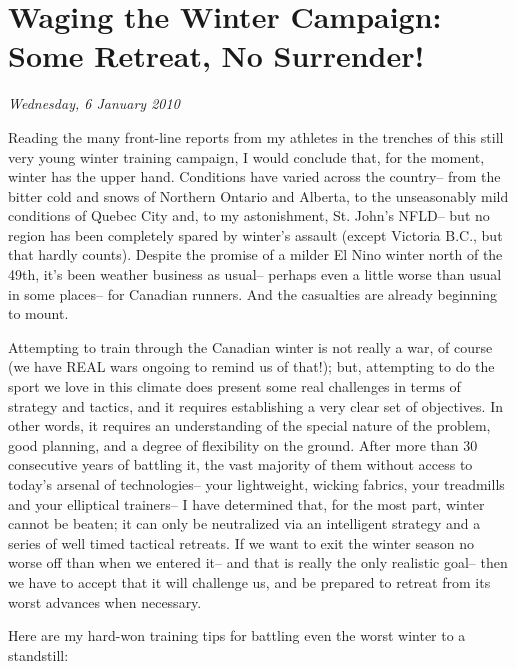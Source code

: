 \chapter{Waging the Winter Campaign: Some Retreat, No Surrender!}
\textit{Wednesday, 6 January 2010}
\bigskip

Reading the many front-line reports from my athletes in the trenches of this still very young winter training campaign, I would conclude that, for the moment, winter has the upper hand. Conditions have varied across the country-- from the bitter cold and snows of Northern Ontario and Alberta, to the unseasonably mild conditions of Quebec City and, to my astonishment, St. John's NFLD-- but no region has been completely spared by winter's assault (except Victoria B.C., but that hardly counts). Despite the promise of a milder El Nino winter north of the 49th, it's been weather business as usual-- perhaps even a little worse than usual in some places-- for Canadian runners. And the casualties are already beginning to mount.

Attempting to train through the Canadian winter is not really a war, of course (we have REAL wars ongoing to remind us of that!); but, attempting to do the sport we love in this climate does present some real challenges in terms of strategy and tactics, and it requires establishing a very clear set of objectives. In other words, it requires an understanding of the special nature of the problem, good planning, and a degree of flexibility on the ground. After more than 30 consecutive years of battling it, the vast majority of them without access to today's arsenal of technologies-- your lightweight, wicking fabrics, your treadmills and your elliptical trainers-- I have determined that, for the most part, winter cannot be beaten; it can only be neutralized via an intelligent strategy and a series of well timed tactical retreats. If we want to exit the winter season no worse off than when we entered it-- and that is really the only realistic goal-- then we have to accept that it will challenge us, and be prepared to retreat from its worst advances when necessary.

Here are my hard-won training tips for battling even the worst winter to a standstill:

